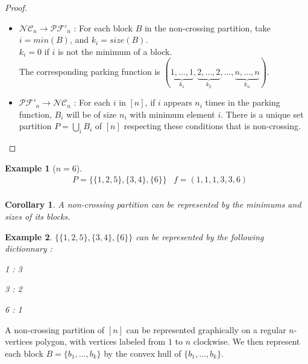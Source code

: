 \documentclass[12pt]{report}
\newtheorem*{example}{Example}
\newtheorem*{cor}{Corollary}
\begin{document}
\begin{proof}
    ~\\
\begin{itemize}
    \item $\mathcal{NC}_n \to \mathcal{PF'}_n$ :
    For each block $B$ in the non-crossing partition, take
    $i = min (B)$, and $k_i = size (B)$.\\
    $k_i = 0$ if $i$ is not the minimum of a block.\\
    The corresponding parking function is
    $(\underbrace{1, \ldots, 1}_{k_1}, \underbrace{2, \ldots,
    2}_{k_2}, \ldots, \underbrace{n, \ldots, n}_{k_n})$.\\
    \item $\mathcal{PF'}_n \to \mathcal{NC}_n$ :
    For each $i$ in $[n]$, if $i$ appears $n_i$ times in the
    parking function, $B_i$ will be of size $n_i$ with minimum
    element $i$.
    There is a unique set partition $\displaystyle P = \bigcup_{i}{B_i}$
    of $[n]$ respecting these conditions that is non-crossing.
\end{itemize}
\end{proof}

\begin{example}[$n = 6$]
    \begin{align*}
        &P = \{\{1, 2, 5\}, \{3, 4\}, \{6\}\}
        &f = (1, 1, 1, 3, 3, 6)\\
    \end{align*}
\end{example}

\begin{cor}
    A non-crossing partition can be represented by the minimums
    and sizes of its blocks.
\end{cor}

\begin{example}
    $\{\{1, 2, 5\}, \{3, 4\}, \{6\}\}$ can be represented by
    the following dictionnary :\\
    \begin{itemize*}
        \item 1 : 3\\
        \item 3 : 2\\
        \item 6 : 1\\
    \end{itemize*}
\end{example}

A non-crossing partition of $[n]$ can be represented graphically
on a regular $n$-vertices polygon, with vertices labeled from $1$
to $n$ clockwise. We then represent each block $B = \{b_1, \ldots, b_k\}$
by the convex hull of $\{b_1, \ldots, b_k\}$.\\
\end{document}

